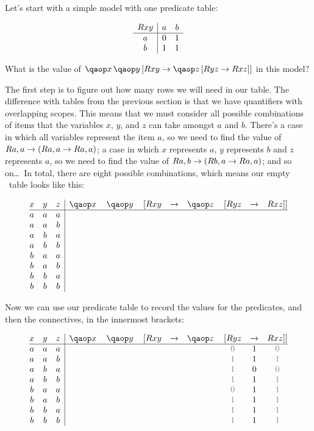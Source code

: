 \documentclass[PHIL101-Textbook.tex]{subfiles}
\begin{document}
Let's start with a simple model with one predicate table: 

\[\begin{array}{c|cc}
  \mathord{R}{xy} & a & b \\ \hline
  a & 0 & 1   \\
  b & 1 & 1\\
\end{array}\]

\noindent What is the value of $\qa{x}{\qab{y}{\atom R {xy} \eif \qab{z}{\atom R {yz}\eif \atom R{xz}}}}$ in this model? 

\noindent  The first step is to figure out how many rows we will need in our table. The difference with tables from the previous section is that we have quantifiers with overlapping scopes. This means that we must consider all possible combinations of items that the variables $x$, $y$, and $z$ can take amongst $a$ and $b$. There's a case in which all variables represent the item $a$, so we need to find the value of $\mathord{R}{a,a} \rightarrow (\mathord{R}{a,a} \rightarrow \mathord{R}{a,a})$; a case in which $x$ represents $a$, $y$ represents $b$ and $z$ represents $a$, so we need to find the value of $\mathord{R}{a,b} \rightarrow (\mathord{R}{b,a} \rightarrow \mathord{R}{a,a})$; and so on\dots\ In total, there are eight possible combinations, which means our empty \pl\ table looks like this: 

\[
\begin{array}{@{}ccc|cccccccc@{}}
  x & y & z & \qa x & \qa y & [\atom R {xy} & \eif & \qa z & [\atom R {yz} & \eif & \atom R {xz}]]\\ \hline
  a & a & a \\
  a & a & b \\
  a & b & a \\
  a & b & b \\
  b & a & a \\
  b & a & b \\
  b & b & a \\
  b & b & b \\
\end{array}
\]

\noindent Now we can use our predicate table to record the values for the predicates, and then the connectives, in the innermost brackets: 


\[
\begin{array}{@{}ccc|cccccccc@{}}
  x & y & z & \qa x & \qa y & [\atom R {xy} & \eif & \qa z & [\atom R {yz} & \eif & \atom R {xz}]]\\ \hline
  a & a & a & &&  &&& \gF & \vT & \gF \\
  a & a & b & &&  &&& \gT & \vT & \gT \\
  a & b & a & &&  &&& \gT & \vF & \gF \\
  a & b & b & &&  &&& \gT & \vT & \gT \\
  b & a & a & &&  &&& \gF & \vT & \gT \\
  b & a & b & &&  &&& \gT & \vT & \gT \\
  b & b & a & &&  &&& \gT & \vT & \gT \\
  b & b & b & &&  &&& \gT & \vT & \gT \\
\end{array}
\]
\end{document}
